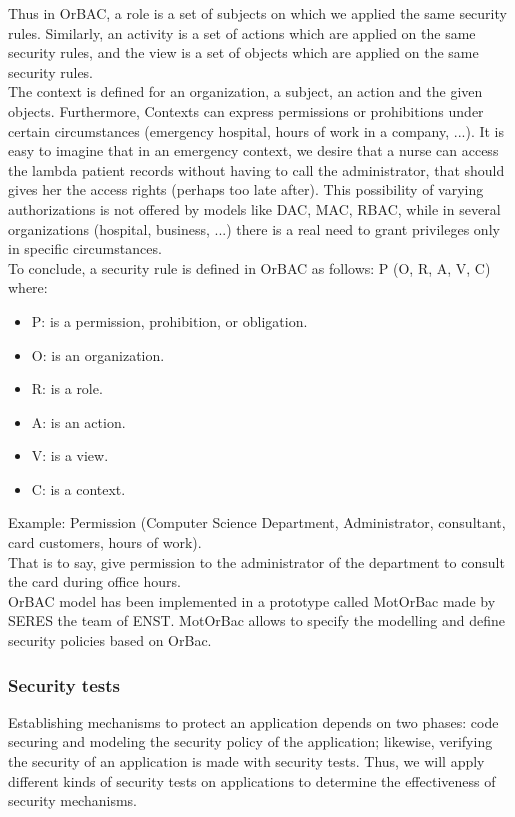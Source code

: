 \documentclass{acm_proc_article-sp}
\begin{document}
Thus in OrBAC, a role is a set of subjects on which we applied the same security rules. Similarly, an activity is a set of actions which are applied on the same security rules, and the view is a set of objects which are applied on the same security rules.\\
The context is defined for an organization, a subject, an action and the given objects. Furthermore, Contexts can express permissions or prohibitions under certain circumstances (emergency hospital, hours of work in a company, ...). It is easy to imagine that in an emergency context, we desire that a nurse can access the lambda patient records without having to call the administrator, that should gives her the access rights (perhaps too late after). This possibility of varying authorizations is not offered by models like DAC, MAC, RBAC, while in several organizations (hospital, business, ...) there is a real need to grant privileges only in specific circumstances. \\
To conclude, a security rule is defined in OrBAC as follows: P (O, R, A, V, C) where:
\begin{itemize}
 \item P: is a permission, prohibition, or obligation.
 \item O: is an organization.
 \item R: is a role.
 \item A: is an action.
 \item V: is a view.
 \item C: is a context.
\end{itemize}
Example: Permission (Computer Science Department, Administrator, consultant, card customers, hours of work).\\
That is to say, give permission to the administrator of the department to consult the card during office hours.\\
OrBAC model has been implemented in a prototype called MotOrBac made by SERES the team of ENST. MotOrBac allows to specify the modelling and define security policies based on OrBac.

\subsubsection{Security tests}
Establishing mechanisms to protect an application depends on two phases: code securing and modeling the security policy of the application; likewise, verifying the security of an application is made with security tests. Thus, we will apply different kinds of security tests on applications to determine the effectiveness of security mechanisms.\\
\end{document}
